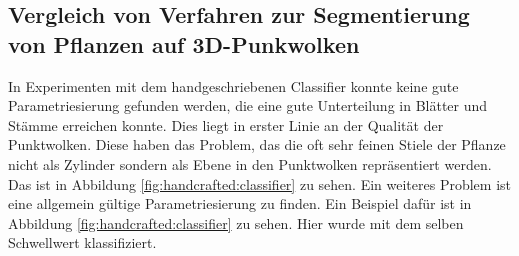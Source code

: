 \documentclass[12pt,titlepage, twoside]{article}
\begin{document}
\subsection{Vergleich von Verfahren zur Segmentierung von Pflanzen auf 3D-Punkwolken}

In Experimenten mit dem handgeschriebenen Classifier konnte keine gute Parametriesierung gefunden werden, die eine gute Unterteilung in Blätter und Stämme erreichen konnte. Dies liegt in erster Linie an der Qualität der Punktwolken.
Diese haben das Problem, das die oft sehr feinen Stiele der Pflanze nicht als Zylinder sondern als Ebene in den Punktwolken repräsentiert werden. Das ist in Abbildung \ref{fig:handcrafted:classifier} zu sehen.
Ein weiteres Problem ist eine allgemein gültige Parametriesierung zu finden. Ein Beispiel dafür ist in Abbildung \ref{fig:handcrafted:classifier} zu sehen. Hier wurde mit dem selben Schwellwert klassifiziert.
\end{document}
